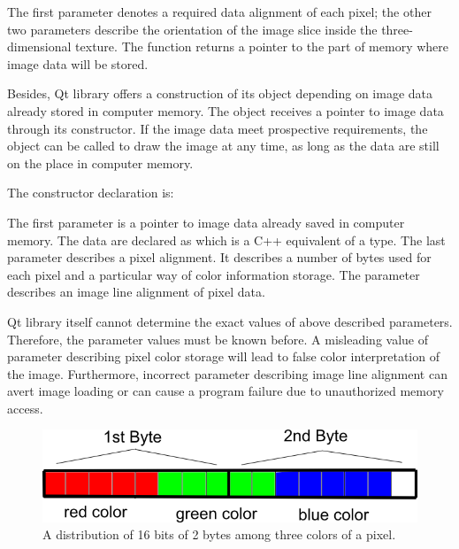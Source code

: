
The first parameter denotes a required data alignment of each pixel; the other two parameters describe the orientation of the image slice inside the three-dimensional texture. The function returns a pointer to the part of memory where image data will be stored.

Besides, Qt library offers a construction of its object depending on image data already stored in computer memory. The object receives a pointer to image data through its constructor. If the image data meet prospective requirements, the object can be called to draw the image at any time, as long as the data are still on the place in computer memory.

The constructor declaration is:


The first parameter is a pointer to image data already saved in computer memory. The data are declared as  which is a C++ equivalent of a  type. The last parameter  describes a pixel alignment. It describes a number of bytes used for each pixel and a particular way of color information storage. The  parameter describes an image line alignment of pixel data.

Qt library itself cannot determine the exact values of above described parameters. Therefore, the parameter values must be known before. A misleading value of parameter describing pixel color storage will lead to false color interpretation of the image. Furthermore, incorrect parameter describing image line alignment can avert image loading or can cause a program failure due to unauthorized memory access.  


\begin{figure}
	\begin{center}
	\includegraphics[width=130mm]{Text/IMG/ImageStoring_16bit.png}
	\end{center}
	\caption{A distribution of 16 bits of 2 bytes among three colors of a pixel.}
	\label{imagestoring}
\end{figure}

